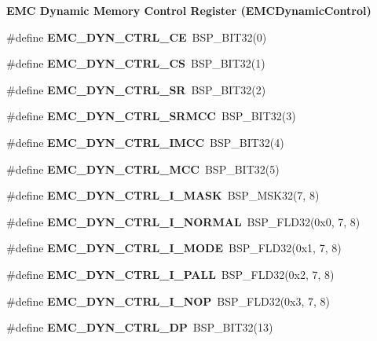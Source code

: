 \begin{Indent}\textbf{ E\+MC Dynamic Memory Control Register (E\+M\+C\+Dynamic\+Control)}\par
\begin{DoxyCompactItemize}
\item 
\#define {\bfseries E\+M\+C\+\_\+\+D\+Y\+N\+\_\+\+C\+T\+R\+L\+\_\+\+CE}~B\+S\+P\+\_\+\+B\+I\+T32(0)
\item 
\#define {\bfseries E\+M\+C\+\_\+\+D\+Y\+N\+\_\+\+C\+T\+R\+L\+\_\+\+CS}~B\+S\+P\+\_\+\+B\+I\+T32(1)
\item 
\#define {\bfseries E\+M\+C\+\_\+\+D\+Y\+N\+\_\+\+C\+T\+R\+L\+\_\+\+SR}~B\+S\+P\+\_\+\+B\+I\+T32(2)
\item 
\#define {\bfseries E\+M\+C\+\_\+\+D\+Y\+N\+\_\+\+C\+T\+R\+L\+\_\+\+S\+R\+M\+CC}~B\+S\+P\+\_\+\+B\+I\+T32(3)
\item 
\#define {\bfseries E\+M\+C\+\_\+\+D\+Y\+N\+\_\+\+C\+T\+R\+L\+\_\+\+I\+M\+CC}~B\+S\+P\+\_\+\+B\+I\+T32(4)
\item 
\#define {\bfseries E\+M\+C\+\_\+\+D\+Y\+N\+\_\+\+C\+T\+R\+L\+\_\+\+M\+CC}~B\+S\+P\+\_\+\+B\+I\+T32(5)
\item 
\#define {\bfseries E\+M\+C\+\_\+\+D\+Y\+N\+\_\+\+C\+T\+R\+L\+\_\+\+I\+\_\+\+M\+A\+SK}~B\+S\+P\+\_\+\+M\+S\+K32(7, 8)
\item 
\#define {\bfseries E\+M\+C\+\_\+\+D\+Y\+N\+\_\+\+C\+T\+R\+L\+\_\+\+I\+\_\+\+N\+O\+R\+M\+AL}~B\+S\+P\+\_\+\+F\+L\+D32(0x0, 7, 8)
\item 
\#define {\bfseries E\+M\+C\+\_\+\+D\+Y\+N\+\_\+\+C\+T\+R\+L\+\_\+\+I\+\_\+\+M\+O\+DE}~B\+S\+P\+\_\+\+F\+L\+D32(0x1, 7, 8)
\item 
\#define {\bfseries E\+M\+C\+\_\+\+D\+Y\+N\+\_\+\+C\+T\+R\+L\+\_\+\+I\+\_\+\+P\+A\+LL}~B\+S\+P\+\_\+\+F\+L\+D32(0x2, 7, 8)
\item 
\#define {\bfseries E\+M\+C\+\_\+\+D\+Y\+N\+\_\+\+C\+T\+R\+L\+\_\+\+I\+\_\+\+N\+OP}~B\+S\+P\+\_\+\+F\+L\+D32(0x3, 7, 8)
\item 
\#define {\bfseries E\+M\+C\+\_\+\+D\+Y\+N\+\_\+\+C\+T\+R\+L\+\_\+\+DP}~B\+S\+P\+\_\+\+B\+I\+T32(13)
\end{DoxyCompactItemize}
\end{Indent}
